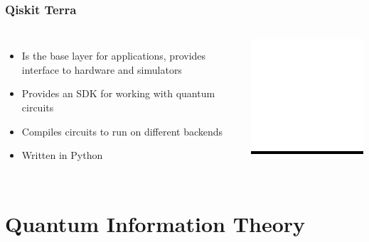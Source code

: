 \documentclass[aspectratio=169,11pt,hyperref={colorlinks=true}]{beamer}
\begin{document}
\begin{frame}
    \frametitle{Qiskit Terra}
    \begin{columns}
           \begin{itemize}
                \item Is the base layer for applications, provides interface to hardware and simulators
                \item Provides an SDK for working with quantum circuits
                \item Compiles circuits to run on different backends
                \item Written in Python
           \end{itemize}
            \centering
            \colorbox{black}{\includegraphics[width=.5\textwidth]{qiskit-terra-logo.png}}
    \end{columns}
\end{frame}

\section{Quantum Information Theory}
\end{document}
